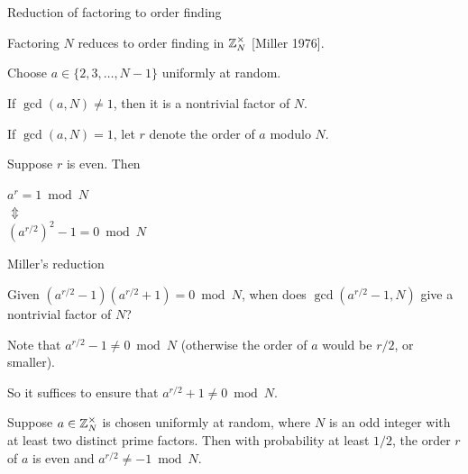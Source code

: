 
\begin{frame}{Reduction of factoring to order finding}
  
Factoring $N$ reduces to order finding in ${\mathbb{Z}}_N^\times$ [Miller 1976].

\pause
\bigskip

Choose $a \in \{2,3,\ldots,N-1\}$ uniformly at random.

\pause
\bigskip

If $\gcd(a,N) \ne 1$, then it is a nontrivial factor of $N$.

\pause
\bigskip

If $\gcd(a,N)=1$, let $r$ denote the order of $a$ modulo $N$.

\pause
\bigskip

Suppose $r$ is even.  Then
\begin{center}
  $a^r = 1 \bmod N$ \\
  $\Updownarrow$ \\
  $(a^{r/2})^2 - 1 = 0 \bmod N$ \\
\end{center}

\end{frame}


\begin{frame}{Miller's reduction}

\begin{question}
  Given $(a^{r/2}-1)(a^{r/2}+1) = 0 \bmod N$, when does $\gcd(a^{r/2}-1,N)$ give a nontrivial factor of $N$?
\end{question}

\pause
\bigskip

Note that $a^{r/2}-1 \ne 0 \bmod N$ (otherwise the order of $a$ would be $r/2$, or smaller).

\bigskip

So it suffices to ensure that $a^{r/2}+1 \ne 0 \bmod N$.

\pause
\bigskip

\begin{lemma}
  Suppose $a \in {\mathbb{Z}}_N^\times$ is chosen uniformly at random, where $N$ is an odd integer with at least two distinct prime factors.  Then with probability at least $1/2$, the order $r$ of $a$ is even and $a^{r/2} \ne -1 \bmod N$.
\end{lemma}

\end{frame}

